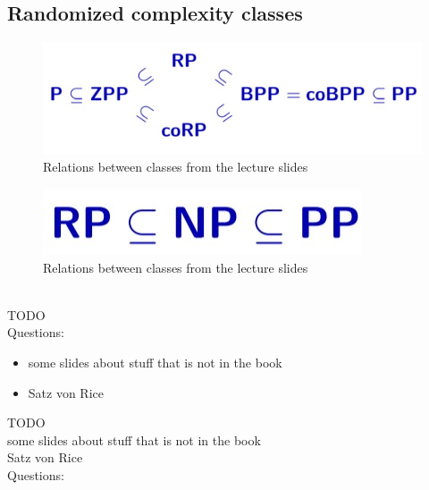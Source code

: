\documentclass[a4]{scrartcl}
\begin{document}





\subsection*{Randomized complexity classes}

\begin{figure}[H]
\begin{center}
\includegraphics[scale=0.5]{cc1.jpg}
\end{center}
\caption{Relations between classes from the lecture slides \cite{CC}}
\end{figure}

\begin{figure}[H]
\begin{center}
\includegraphics[scale=0.5]{cc2.jpg}
\end{center}
\caption{Relations between classes from the lecture slides \cite{CC}}
\end{figure}

\ \\

\color{red} TODO \\
\color{black}
\color{violet} Questions: \\
\color{black}




\begin{itemize}
\item some slides about stuff that is not in the book
\item Satz von Rice
\end{itemize}


\color{red} TODO \\
some slides about stuff that is not in the book \\
Satz von Rice \\
\color{black}
\color{violet} Questions: \\
\color{black}



\newpage

\printbibliography
\end{document}
